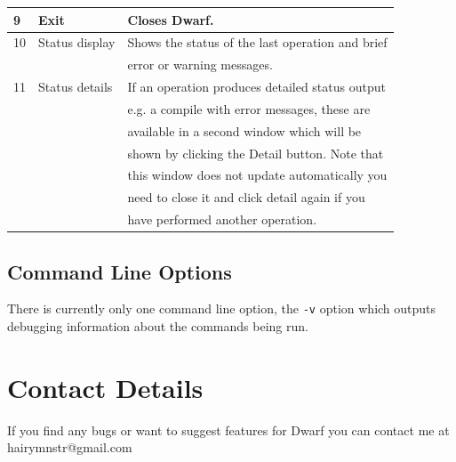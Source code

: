 \documentclass[a4paper,10pt]{article}
\begin{document}
\begin{tabular}{lll}
 \hline
 9&Exit&Closes Dwarf.\\
 \hline
 10&Status display&Shows the status of the last operation and brief\\
 &&error or warning messages.\\
 \hline
 11&Status details&If an operation produces detailed status output\\
 &&e.g. a compile with error messages, these are\\
 &&available in a second window which will be\\
 &&shown by clicking the Detail button.  Note that\\
 &&this window does not update automatically you\\
 &&need to close it and click detail again if you\\
 &&have performed another operation.\\
\end{tabular}

\subsection{Command Line Options}
There is currently only one command line option, the \texttt{-v} option which outputs debugging information about the commands being run.
\section{Contact Details}
If you find any bugs or want to suggest features for Dwarf you can contact me at hairymnstr@gmail.com
\end{document}
